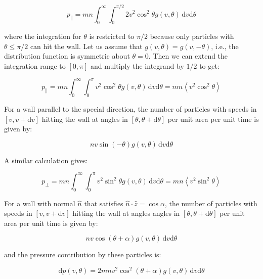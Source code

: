 \documentclass[12pt]{article}
\begin{document}
\begin{equation}
    p_{\parallel} = mn \int_{0}^{\infty} \int_{0}^{\pi/2} 2v^{2} \cos^{2}{\theta} g(v, \theta) \, \mathrm{d}v \mathrm{d}\theta
\end{equation}

where the integration for $\theta$ is restricted to $\pi/2$ because only particles with $\theta \le \pi/2$ can hit the wall. Let us assume that $g(v, \theta) = g(v, -\theta)$, i.e., the distribution function is symmetric about $\theta = 0$. Then we can extend the integration range to $[0, \pi]$ and multiply the integrand by $1/2$ to get:

\begin{equation}
    p_{\parallel} = mn \int_{0}^{\infty} \int_{0}^{\pi} v^{2} \cos^{2}{\theta} g(v, \theta) \, \mathrm{d}v \mathrm{d}\theta = mn \left\langle v^{2} \cos^{2}{\theta} \right\rangle
\end{equation}

For a wall parallel to the special direction, the number of particles with speeds in $[v, v + \mathrm{d}v]$ hitting the wall at angles in $[\theta, \theta + \mathrm{d}\theta]$ per unit area per unit time is given by:

\begin{equation}
    nv \sin{(-\theta)} g(v, \theta) \, \mathrm{d}v \mathrm{d}\theta
\end{equation}

A similar calculation gives:

\begin{equation}
    p_{\perp} = mn \int_{0}^{\infty} \int_{0}^{\pi} v^{2} \sin^{2}{\theta} g(v, \theta) \, \mathrm{d}v \mathrm{d}\theta = mn \left\langle v^{2} \sin^{2}{\theta} \right\rangle
\end{equation}

For a wall with normal $\hat{n}$ that satisfies $\hat{n} \cdot \hat{z} = \cos{\alpha}$, the number of particles with speeds in $[v, v + \mathrm{d}v]$ hitting the wall at angles angles in $[\theta, \theta + \mathrm{d}\theta]$ per unit area per unit time is given by:

\begin{equation}
    nv \cos{(\theta + \alpha)} g(v, \theta) \, \mathrm{d}v \mathrm{d}\theta
\end{equation}

and the pressure contribution by these particles is:

\begin{equation}
    \mathrm{d}p(v, \theta) = 2mnv^{2} \cos^{2}{(\theta + \alpha)} g(v, \theta) \, \mathrm{d}v \mathrm{d}\theta
\end{equation}
\end{document}
